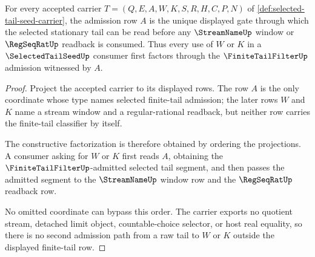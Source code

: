 \begin{theorem}
\label{thm:selected-tail-seed-finite-tail-admission-exactness}
For every accepted carrier $T=(Q,E,A,W,K,S,R,H,C,P,N)$ of \autoref{def:selected-tail-seed-carrier}, the admission row $A$ is the unique displayed gate through which the selected stationary tail can be read before any $\StreamNameUp$ window or $\RegSeqRatUp$ readback is consumed. Thus every use of $W$ or $K$ in a $\SelectedTailSeedUp$ consumer first factors through the $\FiniteTailFilterUp$ admission witnessed by $A$.
\end{theorem}
\begin{proof}
Project the accepted carrier to its displayed rows. The row $A$ is the only coordinate whose type names selected finite-tail admission; the later rows $W$ and $K$ name a stream window and a regular-rational readback, but neither row carries the finite-tail classifier by itself.

The constructive factorization is therefore obtained by ordering the projections. A consumer asking for $W$ or $K$ first reads $A$, obtaining the $\FiniteTailFilterUp$-admitted selected tail segment, and then passes the admitted segment to the $\StreamNameUp$ window row and the $\RegSeqRatUp$ readback row.

No omitted coordinate can bypass this order. The carrier exports no quotient stream, detached limit object, countable-choice selector, or host real equality, so there is no second admission path from a raw tail to $W$ or $K$ outside the displayed finite-tail row.
\end{proof}

